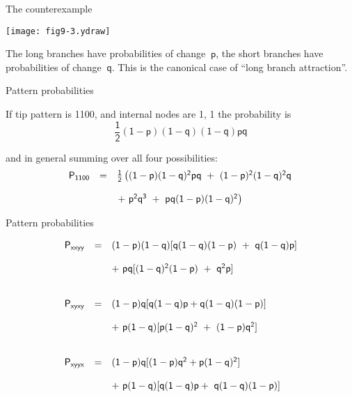 
\begin{slide}[Replace]{The counterexample}

\centerline{\texttt{[image: fig9-3.ydraw]}}
\bigskip

The long branches have probabilities of change $\ \mathsf{p}$, the short
branches have probabilities of change $\ \mathsf{q}$.  This is the canonical
case of ``long branch attraction''.

\end{slide}

\begin{slide}[Replace]{Pattern probabilities}

If tip pattern is 1100, and internal nodes are 1, 1 the probability is
\[
\mathsf{\frac{1}{2}(1-p)(1-q)(1-q)pq}
\]

and in general summing over all four possibilities:
\[
\begin{array}{c c l}
\mathsf{P_{1100}} & \mathsf{=} &  \mathsf{\frac{1}{2}\left((1-p)(1-q)^2pq\ +\ (1-p)^2(1-q)^2q\right.}\\
& & \\
  & & \mathsf{\left.+\ p^2q^3\ +\ pq(1-p)(1-q)^2\right)}
\end{array}
\]

\end{slide}

\begin{slide}[Replace]{Pattern probabilities}

\noindent
\[
\begin{array}{c c l}
\mathsf{P_{xxyy}} &  \mathsf{=} &  \mathsf{(1-p)(1-q)[q(1-q)(1-p)\ +\ q(1-q)p]}\\\
& & \\
& &  \mathsf{+\  pq[(1-q)^2(1-p)\ +\ q^2p]} \\
& & \\
& & \\
\mathsf{P_{xyxy}} & \mathsf{=} & \mathsf{(1-p)q[q(1-q)p+q(1-q)(1-p)]}\\
& & \\
 & & \mathsf{+\ p(1-q)[p(1-q)^2\ +\ (1-p)q^2]} \\
& & \\
& & \\
\mathsf{P_{xyyx}} & \mathsf{=} &  \mathsf{(1-p)q[(1-p)q^2+p(1-q)^2]}\\
& & \\
 & &\mathsf{+\ p(1-q)[q(1-q)p +\ q(1-q)(1-p)]}
\end{array}
\]
 
\end{slide}

